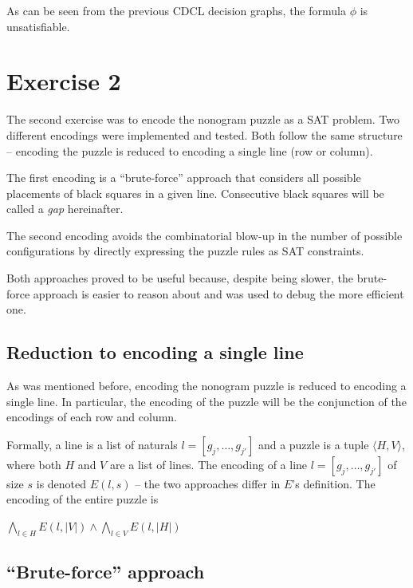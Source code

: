 \documentclass[12pt]{article}
\begin{document}
\vspace{1cm}

As can be seen from the previous CDCL decision graphs, the formula $\phi$ is unsatisfiable.

\section*{Exercise 2}

The second exercise was to encode the nonogram puzzle as a SAT problem.
Two different encodings were implemented and tested.
Both follow the same structure -- encoding the puzzle is reduced to encoding a single line (row or column).

The first encoding is a ``brute-force'' approach that considers all possible placements of black squares in a given line.
Consecutive black squares will be called a \textit{gap} hereinafter.

The second encoding avoids the combinatorial blow-up in the number of possible configurations by directly expressing the puzzle rules as SAT constraints.

Both approaches proved to be useful because, despite being slower, the brute-force approach is easier to reason about and was used to debug the more efficient one.

\subsection*{Reduction to encoding a single line}

As was mentioned before, encoding the nonogram puzzle is reduced to encoding a single line.
In particular, the encoding of the puzzle will be the conjunction of the encodings of each row and column.

Formally, a line is a list of naturals $l = [g_j, \ldots, g_{j'}]$ and a puzzle is a tuple $\langle H, V\rangle$, where both $H$ and $V$ are a list of lines.
The encoding of a line $l = [g_j, \ldots, g_{j'}]$ of size $s$ is denoted $E(l, s)$ -- the two approaches differ in $E$'s definition.
The encoding of the entire puzzle is

\begin{center}
  $\bigwedge\limits_{l \in H} E(l, |V|) \wedge \bigwedge\limits_{l \in V} E(l, |H|)$
\end{center}


\subsection*{``Brute-force'' approach}
\end{document}
